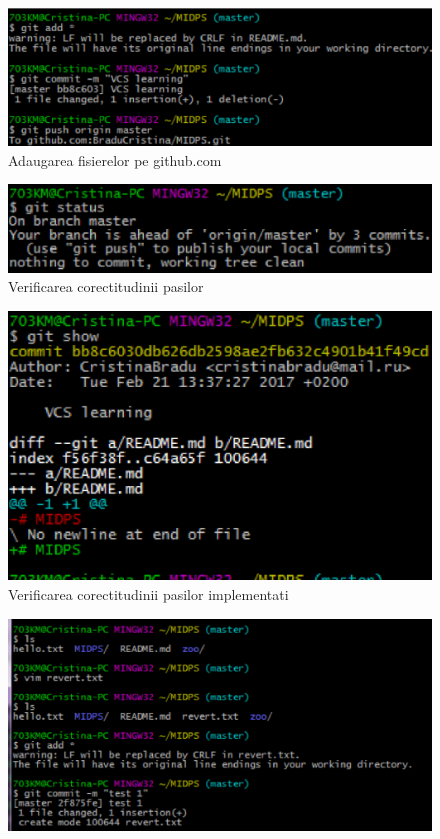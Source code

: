 \documentclass[11pt]{article}
\begin{document}
\begin{figure}[h]
\includegraphics{images/7.eps}
\caption{Adaugarea fisierelor pe github.com}
\end{figure}

\begin{figure}[h]
\includegraphics{images/8.eps}
\caption{Verificarea corectitudinii pasilor}
\end{figure}

\begin{figure}[h]
\includegraphics{images/9.eps}
\caption{Verificarea corectitudinii pasilor implementati}
\end{figure}

\begin{figure}[h]
\includegraphics{images/10.eps}
\end{figure}
\end{document}
